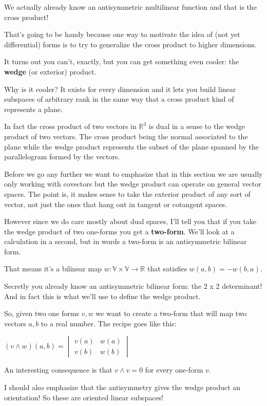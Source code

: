 \documentclass{article}
\begin{document}
We actually already know an antisymmetric multilinear function and that is the
cross product!

That's going to be handy because one way to motivate the idea of (not yet
differential) forms is to try to generalize the cross product to higher
dimensions.

It turns out you can't, exactly, but you can get something even cooler: the
\textbf{wedge} (or exterior) product.

Why is it cooler? It exists for every dimension and it lets you build linear
subspaces of arbitrary rank in the same way that a cross product kind of
represents a plane.

In fact the cross product of two vectors in $\mathbb{R}^{3}$
is dual in a sense to the wedge product of two vectors. The cross product being
the normal associated to the plane while the wedge product represents the subset
of the plane spanned by the parallelogram formed by the vectors.

Before we go any further we want to emphasize that in this section we are
usually only working with covectors but the wedge product can operate on general
vector spaces. The point is, it makes sense to take the exterior product of any sort of vector, not just the
ones that hang out in tangent or cotangent spaces.

However since we do care mostly about dual spaces, I'll tell you that if you take
the wedge product of two one-forms you get a \textbf{two-form}. We'll look at a
calculation in a second, but in words a two-form is an antisymmetric bilinear
form.

That means it's a bilinear map $w: \mathbb{V} \times \mathbb{V} \to \mathbb{R}$
that satisfies $w(a, b) = -w(b, a)$.

Secretly you already know an antisymmetric bilinear form: the 2 x 2 determinant!
And in fact this is what we'll use to define the wedge product.

So, given two one forms $v, w$ we want to create a two-form that will map two
vectors $a, b$ to a real number. The recipe goes like this:

$
(v \wedge w) (a, b) =
\begin{vmatrix}
  v (a) & w (a) \\
  v (b) & w (b)
\end{vmatrix}
$

An interesting consequence is that $v \wedge v = 0$ for every one-form $v$.

I should also emphasize that the antisymmetry gives the wedge product an
orientation! So these are oriented linear subspaces!
\end{document}
